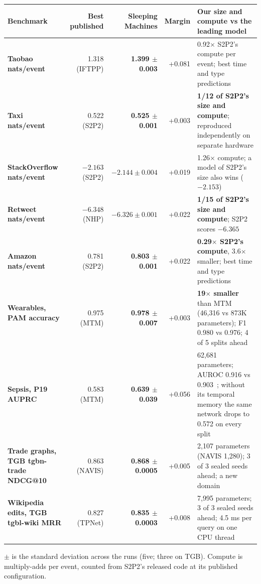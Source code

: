 \documentclass[10pt, a4 paper]{article}
\newcommand{\up}{\,{\color{good}\faArrowUp}}
\begin{document}
{\small
\begin{tabularx}{\linewidth}{>{\bfseries}l r r r Y}
\toprule
Benchmark & Best published & Sleeping Machines & Margin & Our size and compute vs the leading model \\
\midrule
Taobao {\color{muted}\footnotesize nats/event \up} & 1.318 (IFTPP) & \textbf{1.399 $\pm$ 0.003} & +0.081 & 0.92$\times$ S2P2's compute per event; best time and type predictions \\
Taxi {\color{muted}\footnotesize nats/event \up} & 0.522 (S2P2) & \textbf{0.525 $\pm$ 0.001} & +0.003 & \textbf{1/12 of S2P2's size and compute}; reproduced independently on separate hardware \\
StackOverflow {\color{muted}\footnotesize nats/event \up} & $-2.163$ (S2P2) & \textbf{$-2.144 \pm 0.004$} & +0.019 & 1.26$\times$ compute; a model of S2P2's size also wins ($-2.153$) \\
Retweet {\color{muted}\footnotesize nats/event \up} & $-6.348$ (NHP) & \textbf{$-6.326 \pm 0.001$} & +0.022 & \textbf{1/15 of S2P2's size and compute}; S2P2 scores $-6.365$ \\
Amazon {\color{muted}\footnotesize nats/event \up} & 0.781 (S2P2) & \textbf{0.803 $\pm$ 0.001} & +0.022 & \textbf{0.29$\times$ S2P2's compute}, 3.6$\times$ smaller; best time and type predictions \\
Wearables, PAM {\color{muted}\footnotesize accuracy \up} & 0.975 (MTM) & \textbf{0.978 $\pm$ 0.007} & +0.003 & \textbf{19$\times$ smaller} than MTM (46,316 vs 873K parameters); F1 0.980 vs 0.976; 4 of 5 splits ahead \\
Sepsis, P19 {\color{muted}\footnotesize AUPRC \up} & 0.583 (MTM) & \textbf{0.639 $\pm$ 0.039} & +0.056 & 62,681 parameters; AUROC 0.916 vs 0.903 \up; without its temporal memory the same network drops to 0.572 on every split \\
Trade graphs, TGB tgbn-trade {\color{muted}\footnotesize NDCG@10 \up} & 0.863 (NAVIS) & \textbf{0.868 $\pm$ 0.0005} & +0.005 & 2,107 parameters (NAVIS 1,280); 3 of 3 sealed seeds ahead; a new domain \\
Wikipedia edits, TGB tgbl-wiki {\color{muted}\footnotesize MRR \up} & 0.827 (TPNet) & \textbf{0.835 $\pm$ 0.0003} & +0.008 & 7,995 parameters; 3 of 3 sealed seeds ahead; 4.5 ms per query on one CPU thread \\
\bottomrule
\end{tabularx}}
{\footnotesize\color{muted}$\pm$ is the standard deviation across the runs (five; three on TGB). Compute is multiply-adds per event, counted from S2P2's released code at its published configuration.}
\end{document}
